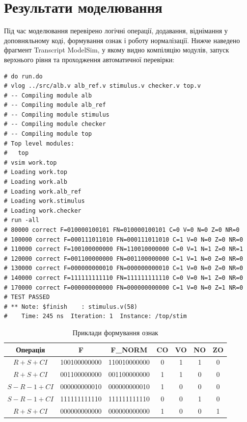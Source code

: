 \documentclass[12pt,a4paper]{article}
\begin{document}
\section*{Результати моделювання}

Під час моделювання перевірено логічні операції, додавання, віднімання у доповняльному коді, формування ознак і роботу нормалізації. Нижче наведено фрагмент Transcript ModelSim, у якому видно компіляцію модулів, запуск верхнього рівня та проходження автоматичної перевірки:

\begin{verbatim}
# do run.do
# vlog ../src/alb.v alb_ref.v stimulus.v checker.v top.v
# -- Compiling module alb
# -- Compiling module alb_ref
# -- Compiling module stimulus
# -- Compiling module checker
# -- Compiling module top
# Top level modules:
#   top
# vsim work.top
# Loading work.top
# Loading work.alb
# Loading work.alb_ref
# Loading work.stimulus
# Loading work.checker
# run -all
# 80000 correct F=010000100101 FN=010000100101 C=0 V=0 N=0 Z=0 NR=0
# 100000 correct F=000111011010 FN=000111011010 C=1 V=0 N=0 Z=0 NR=0
# 110000 correct F=100100000000 FN=110010000000 C=0 V=1 N=1 Z=0 NR=1
# 120000 correct F=001100000000 FN=001100000000 C=1 V=1 N=0 Z=0 NR=0
# 130000 correct F=000000000010 FN=000000000010 C=1 V=0 N=0 Z=0 NR=0
# 140000 correct F=111111111110 FN=111111111110 C=0 V=0 N=1 Z=0 NR=0
# 170000 correct F=000000000000 FN=000000000000 C=1 V=0 N=0 Z=1 NR=0
# TEST PASSED
# ** Note: $finish    : stimulus.v(58)
#    Time: 245 ns  Iteration: 1  Instance: /top/stim
\end{verbatim}

\begin{table}[H]
    \centering
    \renewcommand{\arraystretch}{1.25}
    \begin{tabular}{|c|c|c|c|c|c|c|}
        \hline
        \textbf{Операція} & \textbf{F} & \textbf{F\_NORM} & \textbf{CO} & \textbf{VO} & \textbf{NO} & \textbf{ZO} \\
        \hline
        $R+S+CI$ & 100100000000 & 110010000000 & 0 & 1 & 1 & 0 \\
        \hline
        $R+S+CI$ & 001100000000 & 001100000000 & 1 & 1 & 0 & 0 \\
        \hline
        $S-R-1+CI$ & 000000000010 & 000000000010 & 1 & 0 & 0 & 0 \\
        \hline
        $S-R-1+CI$ & 111111111110 & 111111111110 & 0 & 0 & 1 & 0 \\
        \hline
        $R+S+CI$ & 000000000000 & 000000000000 & 1 & 0 & 0 & 1 \\
        \hline
    \end{tabular}
    \caption{Приклади формування ознак}
\end{table}
\end{document}
